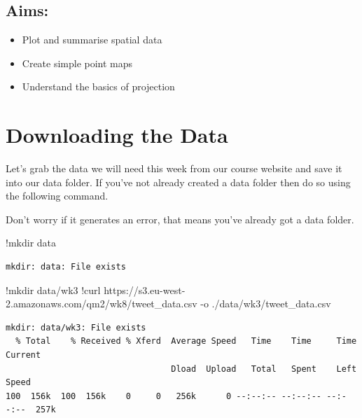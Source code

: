 \documentclass[
  letterpaper,
  DIV=11,
  numbers=noendperiod]{scrreprt}
\newenvironment{Shaded}{\begin{snugshade}}{\end{snugshade}}
\newcommand{\ErrorTok}[1]{\textcolor[rgb]{0.68,0.00,0.00}{#1}}
\newcommand{\FloatTok}[1]{\textcolor[rgb]{0.68,0.00,0.00}{#1}}
\newcommand{\NormalTok}[1]{\textcolor[rgb]{0.00,0.23,0.31}{#1}}
\newcommand{\OperatorTok}[1]{\textcolor[rgb]{0.37,0.37,0.37}{#1}}
\providecommand{\tightlist}{%
  \setlength{\itemsep}{0pt}\setlength{\parskip}{0pt}}\usepackage{longtable,booktabs,array}
\begin{document}
\hypertarget{aims-1}{%
\subsection{Aims:}\label{aims-1}}

\begin{itemize}
\tightlist
\item
  Plot and summarise spatial data
\item
  Create simple point maps
\item
  Understand the basics of projection
\end{itemize}

\hypertarget{downloading-the-data-1}{%
\section{Downloading the Data}\label{downloading-the-data-1}}

Let's grab the data we will need this week from our course website and
save it into our data folder. If you've not already created a data
folder then do so using the following command.

Don't worry if it generates an error, that means you've already got a
data folder.

\begin{Shaded}
\begin{Highlighting}[]
\OperatorTok{!}\NormalTok{mkdir data}
\end{Highlighting}
\end{Shaded}

\begin{verbatim}
mkdir: data: File exists
\end{verbatim}

\begin{Shaded}
\begin{Highlighting}[]
\OperatorTok{!}\NormalTok{mkdir data}\OperatorTok{/}\NormalTok{wk3}
\OperatorTok{!}\NormalTok{curl https:}\OperatorTok{//}\NormalTok{s3.eu}\OperatorTok{{-}}\NormalTok{west}\OperatorTok{{-}}\FloatTok{2.}\ErrorTok{amazonaws}\NormalTok{.com}\OperatorTok{/}\NormalTok{qm2}\OperatorTok{/}\NormalTok{wk8}\OperatorTok{/}\NormalTok{tweet\_data.csv }\OperatorTok{{-}}\NormalTok{o .}\OperatorTok{/}\NormalTok{data}\OperatorTok{/}\NormalTok{wk3}\OperatorTok{/}\NormalTok{tweet\_data.csv}
\end{Highlighting}
\end{Shaded}

\begin{verbatim}
mkdir: data/wk3: File exists
  % Total    % Received % Xferd  Average Speed   Time    Time     Time  Current
                                 Dload  Upload   Total   Spent    Left  Speed
100  156k  100  156k    0     0   256k      0 --:--:-- --:--:-- --:--:--  257k
\end{verbatim}
\end{document}
